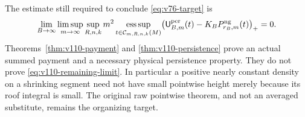 The estimate still required to conclude \eqref{eq:v76-target} is
\begin{equation}\label{eq:v110-remaining-limit}
 \lim_{B\to\infty}\limsup_{m\to\infty}\sup_{R,n,k}m^2
 \operatorname*{ess\,sup}_{t\in\mathcal C_{m,R,n,k}(M)}
 \bigl(\mathsf U_{B,m}^{\rm per}(t)
                    -K_BP_{r_B,m}^{\rm ng}(t)\bigr)_+=0.
\end{equation}
Theorems~\ref{thm:v110-payment} and \ref{thm:v110-persistence}
prove an actual summed payment and a necessary physical persistence
property. They do not prove \eqref{eq:v110-remaining-limit}. In
particular a positive nearly constant density on a shrinking segment
need not have small pointwise height merely because its roof integral
is small. The original raw pointwise theorem, and not an averaged
substitute, remains the organizing target.
